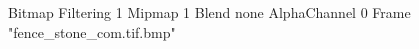 {Bitmap
	{Filtering 1}
	{Mipmap 1}
	{Blend none}
	{AlphaChannel 0}
	{Frame "fence_stone_com.tif.bmp"}
}
